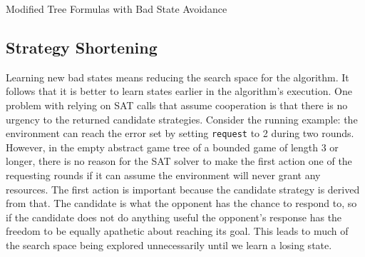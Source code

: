 \begin{algorithm}
    \caption{Modified Tree Formulas with Bad State Avoidance}
    \label{alg:treeFormulaLearning}
    \begin{algorithmic}[1]
        \State {}
        \Else
        \State {}
        \EndIf
        \EndFunction
    \end{algorithmic}

    \begin{algorithmic}[1]
        \State {}
        \Else
        \State {}
        \EndIf
        \EndFunction
    \end{algorithmic}
\end{algorithm}

\subsection{Strategy Shortening}

Learning new bad states means reducing the search space for the algorithm. It follows that it is better to learn states earlier in the algorithm's execution. One problem with relying on SAT calls that assume cooperation is that there is no urgency to the returned candidate strategies. Consider the running example: the environment can reach the error set by setting \texttt{request} to 2 during two rounds. However, in the empty abstract game tree of a bounded game of length 3 or longer, there is no reason for the SAT solver to make the first action one of the requesting rounds if it can assume the environment will never grant any resources. The first action is important because the candidate strategy is derived from that. The candidate is what the opponent has the chance to respond to, so if the candidate does not do anything useful the opponent's response has the freedom to be equally apathetic about reaching its goal. This leads to much of the search space being explored unnecessarily until we learn a losing state.

